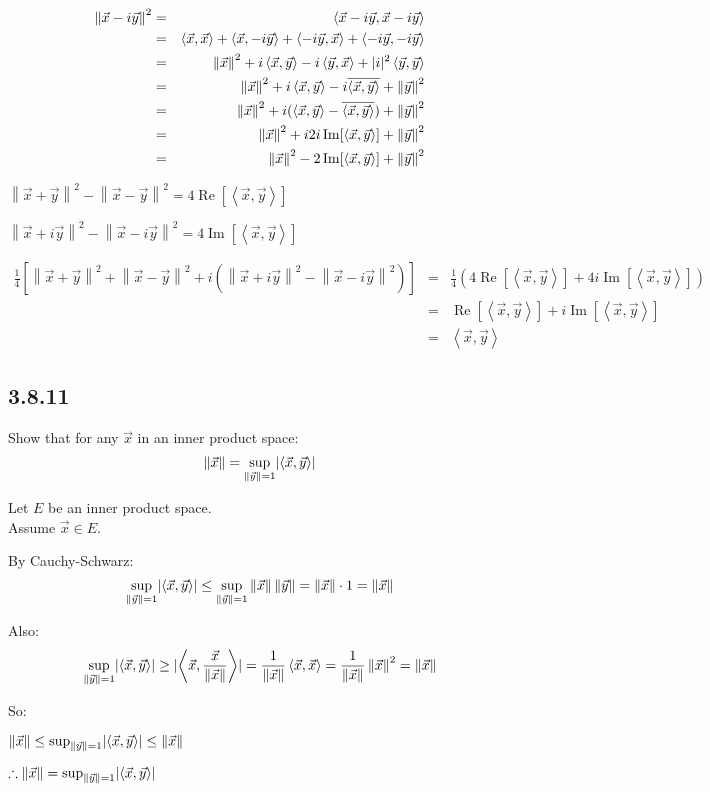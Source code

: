 \documentclass[letterpaper,12pt,fleqn]{article}
\newcommand{\norm}[1]{\left\|#1\right\|}
\newcommand{\inner}[2]{\left<#1,#2\right>}
\newcommand{\conj}[1]{\overline{#1}}
\newcommand{\vx}{\vec{x}}
\newcommand{\vy}{\vec{y}}
\DeclareMathOperator{\Real}{Re}
\DeclareMathOperator{\Imag}{Im}
\begin{document}
\begin{eqnarray*}
  \norm{\vx-i\vy}^2 &=& \inner{\vx-i\vy}{\vx-i\vy} \\
  &=& \inner{\vx}{\vx}+\inner{\vx}{-i\vy}+\inner{-i\vy}{\vx}+
  \inner{-i\vy}{-i\vy} \\
  &=& \norm{\vx}^2+i\inner{\vx}{\vy}-i\inner{\vy}{\vx}+
  \abs{i}^2\inner{\vy}{\vy} \\
  &=& \norm{\vx}^2+i\inner{\vx}{\vy}-i\conj{\inner{\vx}{\vy}}+\norm{\vy}^2 \\
  &=& \norm{\vx}^2+i(\inner{\vx}{\vy}-\conj{\inner{\vx}{\vy}})+\norm{\vy}^2 \\
  &=& \norm{\vx}^2+i2i\Imag[\inner{\vx}{\vy}]+\norm{\vy}^2 \\
  &=& \norm{\vx}^2-2\Imag[\inner{\vx}{\vy}]+\norm{\vy}^2
\end{eqnarray*}

$\norm{\vx+\vy}^2-\norm{\vx-\vy}^2=4\Real[\inner{\vx}{\vy}]$

$\norm{\vx+i\vy}^2-\norm{\vx-i\vy}^2=4\Imag[\inner{\vx}{\vy}]$

\begin{eqnarray*}
\frac{1}{4}\left[\norm{\vx+\vy}^2+\norm{\vx-\vy}^2+
  i(\norm{\vx+i\vy}^2-\norm{\vx-i\vy}^2)\right] &=&
\frac{1}{4}\left(4\Real[\inner{\vx}{\vy}]+4i\Imag[\inner{\vx}{\vy}]\right) \\
&=& \Real[\inner{\vx}{\vy}]+i\Imag[\inner{\vx}{\vy}] \\
&=& \inner{\vx}{\vy}
\end{eqnarray*}

\subsection*{3.8.11}

Show that for any $\vx$ in an inner product space:
\[\norm{\vx}=\sup_{\norm{\vy}=1}\abs{\inner{\vx}{\vy}}\]

Let $E$ be an inner product space. \\
Assume $\vx\in E$.

By Cauchy-Schwarz:
\[\sup_{\norm{\vy}=1}\abs{\inner{\vx}{\vy}}\le
\sup_{\norm{\vy}=1}\norm{\vx}\norm{\vy}=\norm{\vx}\cdot1=\norm{\vx}\]

Also:
\[\sup_{\norm{\vy}=1}\abs{\inner{\vx}{\vy}}\ge
\abs{\inner{\vx}{\frac{\vx}{\norm{\vx}}}}=
\frac{1}{\norm{\vx}}\inner{\vx}{\vx}=\frac{1}{\norm{\vx}}\norm{\vx}^2=
\norm{\vx}\]

So:

$\norm{\vx}\le\sup_{\norm{\vy}=1}\abs{\inner{\vx}{\vy}}\le\norm{\vx}$

$\therefore\norm{\vx}=\sup_{\norm{\vy}=1}\abs{\inner{\vx}{\vy}}$
\end{document}
